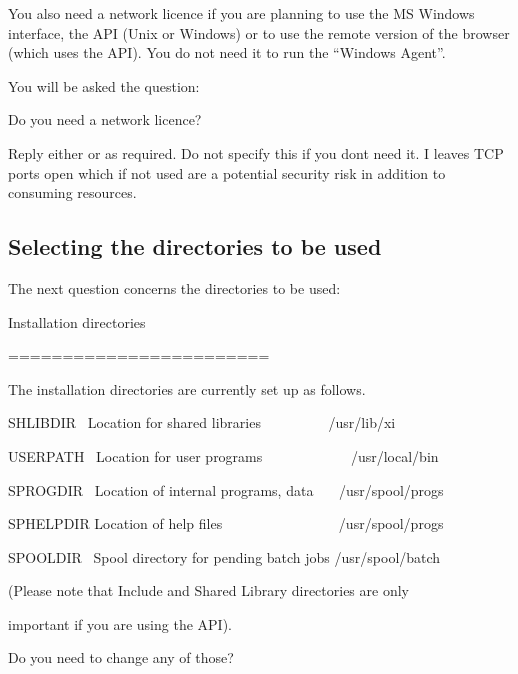 {You also need a network licence if you are planning to use the MS
Windows interface, the API (Unix or Windows) or to use the remote
version of the browser (which uses the API). You do not need it to run
the {\textquotedblleft}Windows Agent{\textquotedblright}.

You will be asked the question:

\begin{expara}

Do you need a network licence?

\end{expara}

Reply either  or  as
required. Do not specify this if you don{\textquotesingle}t need it. I
leaves TCP ports open which if not used are a potential security risk
in addition to consuming resources.

\subsection{Selecting the directories to be used}
The next question concerns the directories to be used:

\begin{expara}

Installation directories

========================

\bigskip

The installation directories are currently set up as follows.

\bigskip

SHLIBDIR \ Location for shared libraries \ \ \ \ \ \ \ \ \ /usr/lib/xi

USERPATH \ Location for user programs
\ \ \ \ \ \ \ \ \ \ \ \ /usr/local/bin

SPROGDIR \ Location of internal programs, data \ \ \ /usr/spool/progs

SPHELPDIR Location of help files
\ \ \ \ \ \ \ \ \ \ \ \ \ \ \ \ /usr/spool/progs

SPOOLDIR \ Spool directory for pending batch jobs /usr/spool/batch

\bigskip

(Please note that Include and Shared Library directories are only

important if you are using the API).

\bigskip

Do you need to change any of those?

\end{expara}

}

